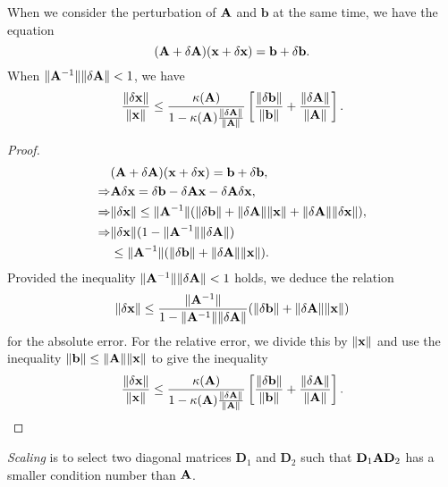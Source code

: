 \begin{thm}
    When we consider the perturbation of ${\mathbf{A}}$ and $\mathbf{b}$ 
    at the same time, we have the equation
    $$
        ({\mathbf{A}}+\mathbf{\delta A})({\mathbf{x}}+\mathbf{\delta x})=
        \mathbf{b}+\mathbf{\delta b}.
    $$ 
    When $\|{\mathbf{A}}^{-1}\|\|\mathbf{\delta A}\|<1$, we have
    $$
        \frac{\|\mathbf{\delta x}\|}{\|{\mathbf{x}}\|}
        \leq \frac{\kappa({\mathbf{A}})}{1-\kappa({\mathbf{A}})
        \frac{\|\mathbf{\delta A}\|}{\|{\mathbf{A}}\|}}
        \left[\frac{\|\mathbf{\delta b\|}}{\|\mathbf{b}\|}
        +\frac{\|\mathbf{\delta A}\|}{\|{\mathbf{A}}\|}\right].
    $$ 
\end{thm}
\begin{proof}
    \begin{align*}
        &({\mathbf{A}}+\mathbf{\delta A})({\mathbf{x}}+\mathbf{\delta x})=
        \mathbf{b}+\mathbf{\delta b},\\
        \Rightarrow&{\mathbf{A}}\mathbf{\delta x}=\mathbf{\delta b}
        -\mathbf{\delta A}{\mathbf{x}}-\mathbf{\delta A}
        \mathbf{\delta x},\\
        \Rightarrow&\|\mathbf{\delta x}\|\leq\|{\mathbf{A}}^{-1}\|
        (\|\mathbf{\delta b}\|+\|\mathbf{\delta A}\|\|{\mathbf{x}}\|
        +\|\mathbf{\delta A}\|\|\mathbf{\delta x}\|),\\
        \Rightarrow&\|\mathbf{\delta x}\|(1-\|{\mathbf{A}}^{-1}\|
        \|\mathbf{\delta A}\|)\\&\leq \|{\mathbf{A}}^{-1}\|(\|
        \mathbf{\delta b}\|+\|\mathbf{\delta A}\|\|{\mathbf{x}}\|).
    \end{align*}
    Provided the inequality $\|{\mathbf{A}}^{-1}\|\|\mathbf{\delta A}\|
    <1$ holds, we deduce the relation
    $$
        \|\mathbf{\delta x}\|\leq\frac{\|{\mathbf{A}}^{-1}\|}
        {1-\|{\mathbf{A}}^{-1}\|\|\mathbf{\delta A}\|}(\|
        \mathbf{\delta b}\|+\|\mathbf{\delta A}\|\|{\mathbf{x}}\|)
    $$ 
    for the absolute error. For the relative error, we divide 
    this by $\|{\mathbf{x}}\|$ and use the inequality $\|\mathbf{b}\|
    \leq\|{\mathbf{A}}\|\|{\mathbf{x}}\|$ to give the inequality
    $$
    \frac{\|\mathbf{\delta x}\|}{\|{\mathbf{x}}\|}
    \leq \frac{\kappa({\mathbf{A}})}{1-\kappa({\mathbf{A}})
    \frac{\|\mathbf{\delta A}\|}{\|{\mathbf{A}}\|}}
    \left[\frac{\|\mathbf{\delta b\|}}{\|\mathbf{b}\|}
    +\frac{\|\mathbf{\delta A}\|}{\|{\mathbf{A}}\|}\right].
    $$ 
\end{proof}

\begin{defn}[Scaling]
    \textit{Scaling} is to select two diagonal matrices 
    $\mathbf{D}_1$ and $\mathbf{D}_2$ such that
    $\mathbf{D}_1{\mathbf{A}}\mathbf{D}_2$
    has a smaller condition number than ${\mathbf{A}}$.
\end{defn}

